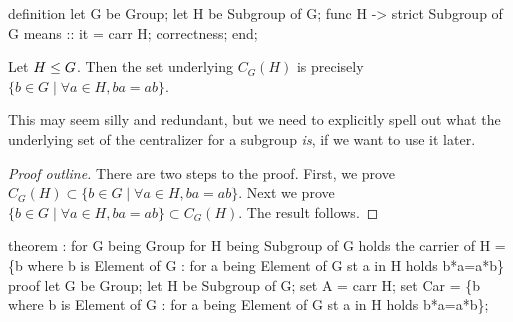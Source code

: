\nwenddocs{}\endmoddef\nwstartdeflinemarkup{}\nwenddeflinemarkup
definition
  let G be Group;
  let H be Subgroup of G;
  func  H -> strict Subgroup of G means
  ::
  it =  carr H;
  correctness;
end;
\eatline
{}\nwendcode{}\nwdocspar
\begin{theorem}
  Let $H\leq G$. Then the set underlying $C_{G}(H)$ is precisely
  $\{b\in G\mid\forall a\in H, ba=ab\}$.
\end{theorem}

\begin{thm-remark}
  This may seem silly and redundant, but we need to explicitly spell out
  what the underlying set of the centralizer for a subgroup \emph{is},
  if we want to use it later.
\end{thm-remark}

\begin{proof}[Proof outline]
  There are two steps to the proof. First, we prove
  $C_{G}(H) \subset \{b\in G\mid\forall a\in H, ba=ab\}$.
  Next we prove $\{b\in G\mid\forall a\in H, ba=ab\}\subset C_{G}(H)$.
  The result follows.
\end{proof}

\nwenddocs{}\endmoddef\nwstartdeflinemarkup{}\nwenddeflinemarkup
theorem :
  for G being Group
  for H being Subgroup of G
  holds the carrier of  H = \{b where b is Element of G : for a
  being Element of G st a in H holds b*a=a*b\}
proof
  let G be Group;
  let H be Subgroup of G;
  set A = carr H;
  set Car = \{b where b is Element of G : for a being Element of G st a in H
                                         holds b*a=a*b\};


